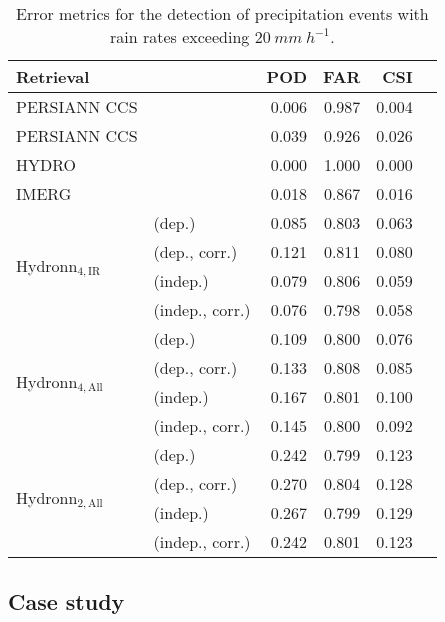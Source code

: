 \documentclass[journal abbreviation, manuscript]{copernicus}
\begin{document}
\begin{table}
  \caption{Error metrics for the detection of precipitation events with rain rates exceeding
    $20\ \unit{mm\ h^{-1}}$.}
  \label{tab:detection}
\begin{tabular}{ll|rrrr}
Retrieval     & &   POD &   FAR &   CSI\\
\hline
PERSIANN CCS  & & 0.006 & 0.987 &  0.004 \\
PERSIANN CCS  & & 0.039 & 0.926 &  0.026 \\
HYDRO         & & 0.000 & 1.000 &  0.000 \\
IMERG         & & 0.018 & 0.867 &  0.016 \\
\hline
\multirow{4}{*}{Hydronn$_{4, \text{IR}}$} & (dep.)          & 0.085 & 0.803 &  0.063 \\
& (dep., corr.)   & 0.121 & 0.811 &  0.080 \\
& (indep.)        & 0.079 & 0.806 &  0.059 \\
& (indep., corr.) & 0.076 & 0.798 &  0.058 \\
\hline
\multirow{4}{*}{Hydronn$_{4, \text{All}}$} &  (dep.)         & 0.109 & 0.800 &  0.076 \\
&  (dep., corr.)  & 0.133 & 0.808 &  0.085 \\
&  (indep.)       & 0.167 & 0.801 &  0.100 \\
&  (indep., corr.)& 0.145 & 0.800 &  0.092 \\
\hline
\multirow{4}{*}{Hydronn$_{2, \text{All}}$} &  (dep.)         & 0.242 & 0.799 &  0.123 \\
&  (dep., corr.)  & 0.270 & 0.804 &  0.128 \\
&  (indep.)       & 0.267 & 0.799 &  0.129 \\
&  (indep., corr.)& 0.242 & 0.801 &  0.123 \\
\end{tabular}
\end{table}


\subsection{Case study}
\end{document}

